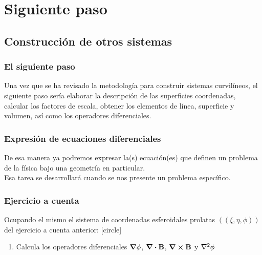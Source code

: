 \documentclass[12pt]{beamer}
\begin{document}
\section{Siguiente paso}
\subsection{Construcción de otros sistemas}
\begin{frame}
\frametitle{El siguiente paso}
Una vez que se ha revisado la metodología para construir sistemas curvilíneos, el siguiente paso sería elaborar la descripción de las superficies coordenadas, calcular los factores de escala, obtener los elementos de línea, superficie y volumen, así como los operadores diferenciales.
\end{frame}
\begin{frame}
\frametitle{Expresión de ecuaciones diferenciales}
De esa manera ya podremos expresar la(s) ecuación(es) que definen un problema de la física bajo una geometría en particular.
\\
\bigskip
Esa tarea se desarrollará cuando se nos presente un problema específico.
\end{frame}
\begin{frame}
\frametitle{Ejercicio a cuenta}
Ocupando el mismo el sistema de coordenadas esferoidales prolatas $((\xi, \eta, \phi))$ del ejercicio a cuenta anterior:
[circle]
\begin{enumerate}
\item Calcula los operadores diferenciales $\grad{\phi}$, $\div{\vb{B}}$, $\curl{\vb{B}}$ y $\laplacian{\phi}$
\end{enumerate}
\end{frame}
\end{document}
